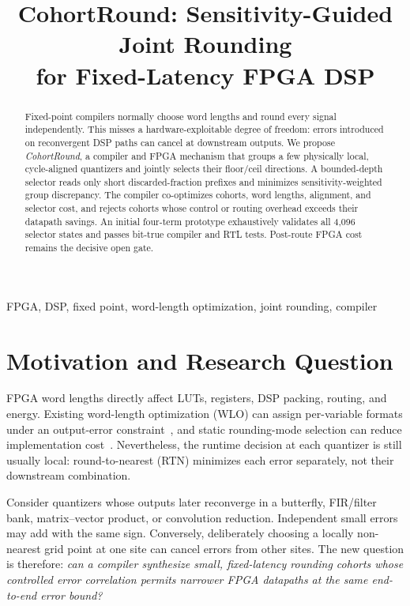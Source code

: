 \documentclass[conference]{IEEEtran}
\title{CohortRound: Sensitivity-Guided Joint Rounding\\
for Fixed-Latency FPGA DSP}
\author{\IEEEauthorblockN{Anonymous Authors}
\IEEEauthorblockA{Three-Page Research Proposal for DAC}}
\begin{document}
\maketitle

\begin{abstract}
Fixed-point compilers normally choose word lengths and round every signal
independently. This misses a hardware-exploitable degree of freedom: errors
introduced on reconvergent DSP paths can cancel at downstream outputs.
We propose \emph{CohortRound}, a compiler and FPGA mechanism that groups a few
physically local, cycle-aligned quantizers and jointly selects their floor/ceil
directions. A bounded-depth selector reads only short discarded-fraction
prefixes and minimizes sensitivity-weighted group discrepancy. The compiler
co-optimizes cohorts, word lengths, alignment, and selector cost, and rejects
cohorts whose control or routing overhead exceeds their datapath savings. An
initial four-term prototype exhaustively validates all 4,096 selector states
and passes bit-true compiler and RTL tests. Post-route FPGA cost remains the
decisive open gate.
\end{abstract}

\begin{IEEEkeywords}
FPGA, DSP, fixed point, word-length optimization, joint rounding, compiler
\end{IEEEkeywords}

\section{Motivation and Research Question}

FPGA word lengths directly affect LUTs, registers, DSP packing, routing, and
energy. Existing word-length optimization (WLO) can assign per-variable formats
under an output-error constraint~\cite{winandy2025}, and static rounding-mode
selection can reduce implementation cost~\cite{menard2010}. Nevertheless, the
runtime decision at each quantizer is still usually local: round-to-nearest
(RTN) minimizes each error separately, not their downstream combination.

Consider quantizers whose outputs later reconverge in a butterfly, FIR/filter
bank, matrix--vector product, or convolution reduction. Independent small
errors may add with the same sign. Conversely, deliberately choosing a locally
non-nearest grid point at one site can cancel errors from other sites. The new
question is therefore: \emph{can a compiler synthesize small, fixed-latency
rounding cohorts whose controlled error correlation permits narrower FPGA
datapaths at the same end-to-end error bound?}
\end{document}
